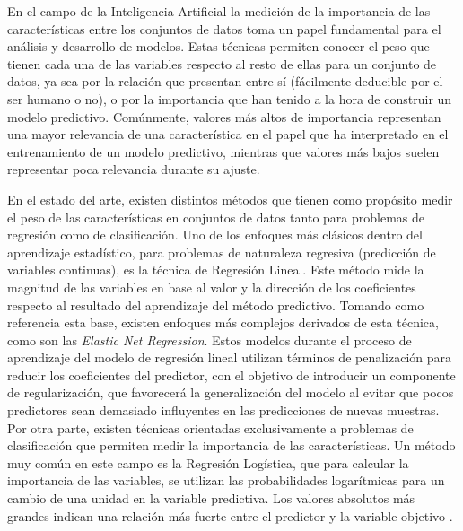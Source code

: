 En el campo de la Inteligencia Artificial la medición de la importancia de las características entre los conjuntos de datos toma un papel fundamental para el análisis y desarrollo de modelos. Estas técnicas permiten conocer el peso que tienen cada una de las variables respecto al resto de ellas para un conjunto de datos, ya sea por la relación que presentan entre sí (fácilmente deducible por el ser humano o no), o por la importancia que han tenido a la hora de construir un modelo predictivo. Comúnmente, valores más altos de importancia representan una mayor relevancia de una característica  en el papel que ha interpretado en el entrenamiento de un modelo predictivo, mientras que valores más bajos suelen representar poca relevancia durante su ajuste.

En el estado del arte, existen distintos métodos que tienen como propósito medir el peso de las características en conjuntos de datos tanto para problemas de regresión como de clasificación. Uno de los enfoques más clásicos dentro del aprendizaje estadístico, para problemas de naturaleza regresiva (predicción de variables continuas), es la técnica de Regresión Lineal. Este método mide la magnitud de las variables en base al valor y la dirección de los coeficientes respecto al resultado del aprendizaje del método predictivo. Tomando como referencia esta base, existen enfoques más complejos derivados de esta técnica, como son las \textit{Elastic Net Regression}. Estos modelos durante el proceso de aprendizaje del modelo de regresión lineal utilizan términos de penalización para reducir los coeficientes del predictor, con el objetivo de introducir un componente de regularización, que favorecerá la generalización del modelo al evitar que pocos predictores sean demasiado influyentes en las predicciones de nuevas muestras. Por otra parte, existen técnicas orientadas exclusivamente a problemas de clasificación que permiten medir la importancia de las características. Un método muy común en este campo es la Regresión Logística, que para calcular la importancia de las variables, se utilizan las probabilidades logarítmicas para un cambio de una unidad en la variable predictiva. Los valores absolutos más grandes indican una relación más fuerte entre el predictor y la variable objetivo \cite{Saarela2021}.


